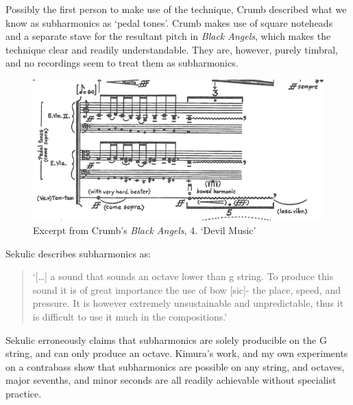   Possibly the first person to make use of the technique, Crumb described what we know as subharmonics as `pedal tones'.\autocite{crumbBlackAngelsImages1971}
  Crumb makes use of square noteheads and a separate stave for the resultant pitch in \emph{Black Angels}, which makes the technique clear and readily understandable.\autocite[]{crumbBlackAngels1995}
  They are, however, purely timbral, and no recordings seem to treat them as subharmonics.
  
  \begin{figure}
    \includegraphics[width=\linewidth]{./resources/crumbBlackAngels.png}
    \caption{Excerpt from Crumb's \emph{Black Angels}, 4. `Devil Music'}\label{fig:Excerpt from Crumb's Black Angels}\end{figure}

Sekulic describes subharmonics as:

\begin{quotation}
  `[\ldots] a sound that sounds an octave lower than g string. To produce this sound it is of great importance the use of bow [sic]- the place, speed, and pressure. It is however extremely unsustainable and unpredictable, thus it is difficult to use it much in the compositions.'\autocite[15]{sekulicYouHearMe2012}\end{quotation}

Sekulic erroneously claims that subharmonics are solely producible on the G string, and can only produce an octave. 
Kimura's work, and my own experiments on a contrabass show that subharmonics are possible on any string, and octaves, major sevenths, and minor seconds are all readily achievable without specialist practice.\autocite[]{kimuraHowProduceSubharmonics1999}




